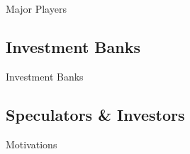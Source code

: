 \documentclass[10pt]{article}
\begin{document}
    \begin{core}{Major Players}


    \end{core}

  \subsection{Investment Banks}

    \begin{core}{Investment Banks}


    \end{core}

  \subsection{Speculators \& Investors}

    \begin{core}{Motivations}


    \end{core}
\end{document}
